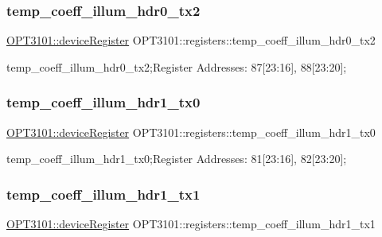 \subsubsection{\texorpdfstring{temp\+\_\+coeff\+\_\+illum\+\_\+hdr0\+\_\+tx2}{temp\_coeff\_illum\_hdr0\_tx2}}
{\footnotesize\ttfamily \mbox{\hyperlink{class_o_p_t3101_1_1device_register}{O\+P\+T3101\+::device\+Register}} O\+P\+T3101\+::registers\+::temp\+\_\+coeff\+\_\+illum\+\_\+hdr0\+\_\+tx2}



temp\+\_\+coeff\+\_\+illum\+\_\+hdr0\+\_\+tx2;Register Addresses\+: 87\mbox{[}23\+:16\mbox{]}, 88\mbox{[}23\+:20\mbox{]}; 

\mbox{\label{class_o_p_t3101_1_1registers_a587a6142ddb574def867aa9f545a8d9c}} 
\subsubsection{\texorpdfstring{temp\+\_\+coeff\+\_\+illum\+\_\+hdr1\+\_\+tx0}{temp\_coeff\_illum\_hdr1\_tx0}}
{\footnotesize\ttfamily \mbox{\hyperlink{class_o_p_t3101_1_1device_register}{O\+P\+T3101\+::device\+Register}} O\+P\+T3101\+::registers\+::temp\+\_\+coeff\+\_\+illum\+\_\+hdr1\+\_\+tx0}



temp\+\_\+coeff\+\_\+illum\+\_\+hdr1\+\_\+tx0;Register Addresses\+: 81\mbox{[}23\+:16\mbox{]}, 82\mbox{[}23\+:20\mbox{]}; 

\mbox{\label{class_o_p_t3101_1_1registers_a4c2057d1c2f04ad96359441cdaaecf57}} 
\subsubsection{\texorpdfstring{temp\+\_\+coeff\+\_\+illum\+\_\+hdr1\+\_\+tx1}{temp\_coeff\_illum\_hdr1\_tx1}}
{\footnotesize\ttfamily \mbox{\hyperlink{class_o_p_t3101_1_1device_register}{O\+P\+T3101\+::device\+Register}} O\+P\+T3101\+::registers\+::temp\+\_\+coeff\+\_\+illum\+\_\+hdr1\+\_\+tx1}



